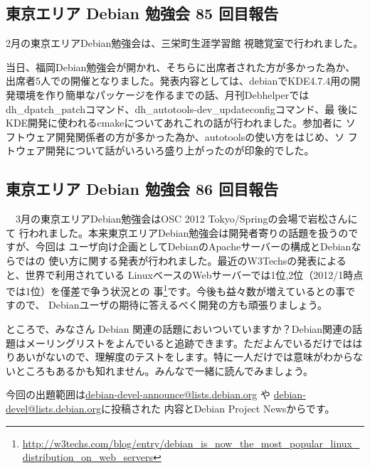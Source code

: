 \documentclass[mingoth,a4paper]{jsarticle}
\begin{document}

\subsection{東京エリア Debian 勉強会 85 回目報告}

 2月の東京エリアDebian勉強会は、三栄町生涯学習館 視聴覚室で行われました。

当日、福岡Debian勉強会が開かれ、そちらに出席者された方が多かった為か、
出席者5人での開催となりました。発表内容としては、debianでKDE4.7.4用の開
発環境を作り簡単なパッケージを作るまでの話、月刊Debhelperでは
dh\_dpatch\_patchコマンド、dh\_autotools-dev\_updateconfigコマンド、最
後にKDE開発に使われるcmakeについてあれこれの話が行われました。参加者に
ソフトウェア開発関係者の方が多かった為か、autotoolsの使い方をはじめ、ソ
フトウェア開発について話がいろいろ盛り上がったのが印象的でした。

\subsection{東京エリア Debian 勉強会 86 回目報告}

　3月の東京エリアDebian勉強会はOSC 2012 Tokyo/Springの会場で岩松さんにて
行われました。本来東京エリアDebian勉強会は開発者寄りの話題を扱うのですが、今回は
ユーザ向け企画としてDebianのApacheサーバーの構成とDebianならではの
使い方に関する発表が行われました。最近のW3Techsの発表によると、世界で利用されている
LinuxベースのWebサーバーでは1位,2位（2012/1時点では1位）を僅差で争う状況との
事\footnote{\url{http://w3techs.com/blog/entry/debian_is_now_the_most_popular_linux_distribution_on_web_servers}}です。今後も益々数が増えているとの事ですので、
Debianユーザの期待に答えるべく開発の方も頑張りましょう。


ところで、みなさん Debian 関連の話題においついていますか？Debian関連の話
題はメーリングリストをよんでいると追跡できます。ただよんでいるだけではは
りあいがないので、理解度のテストをします。特に一人だけでは意味がわからな
いところもあるかも知れません。みんなで一緒に読んでみましょう。

今回の出題範囲は\url{debian-devel-announce@lists.debian.org} や \url{debian-devel@lists.debian.org}に投稿された
内容とDebian Project Newsからです。

\begin{multicols}{2}
 
\end{multicols}
\end{document}
